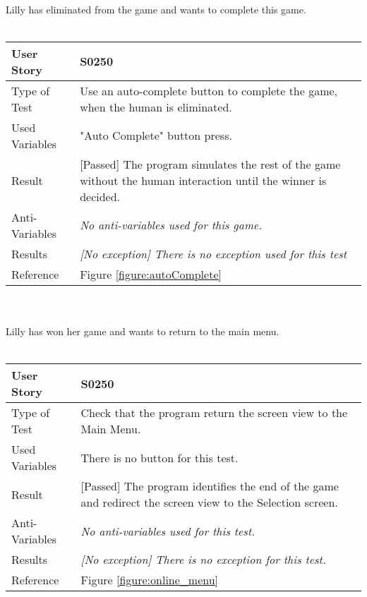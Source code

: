 \vspace{0.2cm}\\
Lilly has eliminated from the game and wants to complete this game.\\
\vspace{0.2cm}\\  
\begin{tabular}{l | p{12cm}}
User Story & \textbf{S0250}\\ \hline
Type of Test & Use an auto-complete button to complete the game, when the human is eliminated.\\ \hline
Used Variables & "Auto Complete" button press.\\ \hline
Result & [Passed] The program simulates the rest of the game without the human interaction until the winner is decided.\\ \hline
Anti-Variables & \emph{No anti-variables used for this game.}\\ \hline
Results & \emph{[No exception] There is no exception used for this test}\\ \hline
Reference & Figure \ref{figure:autoComplete} \\ \hline
\end{tabular}\\
\vspace{0.2cm}\\
Lilly has won her game and wants to return to the main menu.\\
\vspace{0.2cm}\\  
\begin{tabular}{l | p{12cm}}
User Story & \textbf{S0250}\\ \hline
Type of Test & Check that the program return the screen view to the Main Menu.\\ \hline
Used Variables & There is no button for this test.\\ \hline
Result & [Passed] The program identifies the end of the game and redirect the screen view to the Selection screen.\\ \hline
Anti-Variables & \emph{No anti-variables used for this test.}\\ \hline
Results & \emph{[No exception] There is no exception for this test.}\\ \hline
Reference & Figure \ref{figure:online_menu} \\ \hline
\end{tabular}\\
\vspace{0.2cm}\\
